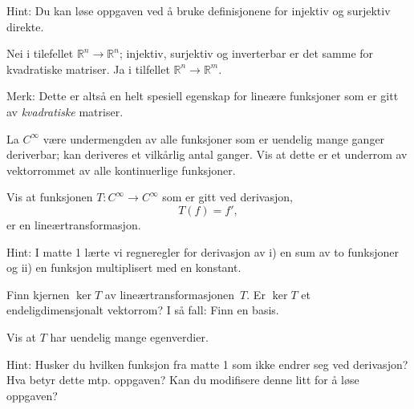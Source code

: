 \begin{losning}

\begin{punkt}
Hint: Du kan løse oppgaven ved å bruke definisjonene for injektiv og surjektiv direkte.
\end{punkt}

\begin{punkt}
Nei i tilefellet $\mathbb{R}^n\rightarrow \mathbb{R}^n$; injektiv, surjektiv og inverterbar er det samme for kvadratiske matriser. Ja i tilfellet $\mathbb{R}^n\rightarrow \mathbb{R}^m$.


\noindent
Merk: Dette er altså en helt spesiell egenskap for lineære funksjoner som er gitt av \emph{kvadratiske} matriser.
\end{punkt}


\end{losning}

\begin{oppgave}
\begin{punkt}
La $C^\infty$ være undermengden av alle funksjoner som er uendelig mange ganger deriverbar; kan deriveres et vilkårlig antal ganger. Vis at dette er et underrom av vektorrommet av alle kontinuerlige funksjoner.
\end{punkt}

\begin{punkt}
Vis at funksjonen $T:C^\infty\rightarrow C^\infty$ som er gitt ved derivasjon, $$T(f)=f',$$ er en lineærtransformasjon.

\noindent
Hint: I matte 1 lærte vi regneregler for derivasjon av i) en sum av to funksjoner og ii) en funksjon multiplisert med en konstant.
\end{punkt}

\begin{punkt}
Finn kjernen $\ker T$ av lineærtransformasjonen~$T$.
Er $\ker T$ et endeligdimensjonalt vektorrom?  I så fall: Finn en basis.
\end{punkt}

\begin{punkt}
Vis at $T$ har uendelig mange egenverdier.

\noindent 
Hint: Husker du hvilken funksjon fra matte 1 som ikke endrer seg ved derivasjon? Hva betyr dette mtp. oppgaven? Kan du modifisere denne litt for å løse oppgaven?
\end{punkt}
\end{oppgave}
